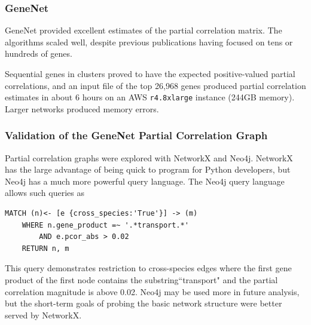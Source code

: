 \subsubsection{GeneNet}
GeneNet provided excellent estimates of the partial correlation matrix.
The algorithms scaled well, despite previous publications having focused on tens or hundreds of genes.

Sequential genes in clusters proved to have the expected positive-valued partial correlations, and an input file of the top 26,968 genes produced partial correlation estimates in about 6 hours on an AWS \texttt{r4.8xlarge} instance (244GB memory). %
Larger networks produced memory errors.

\subsubsection{Validation of the GeneNet Partial Correlation Graph}

Partial correlation graphs were explored with NetworkX and Neo4j.
NetworkX has the large advantage of being quick to program for Python developers, but Neo4j has a much more powerful query language.
The Neo4j query language allows such queries as
\begin{verbatim}
MATCH (n)<- [e {cross_species:'True'}] -> (m)
    WHERE n.gene_product =~ '.*transport.*'
        AND e.pcor_abs > 0.02
    RETURN n, m
\end{verbatim}
This query demonstrates restriction to cross-species edges where the first gene product of the first node contains the substring``transport" and the partial correlation magnitude is above 0.02.
Neo4j may be used more in future analysis, but the short-term goals of probing the basic network structure were better served by NetworkX.

